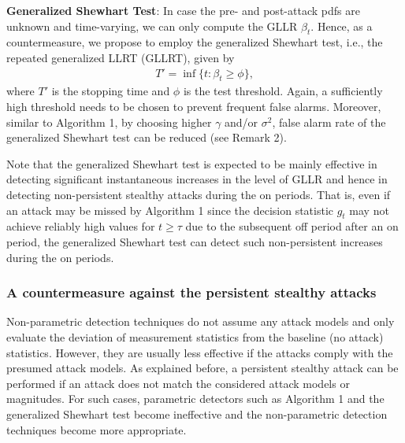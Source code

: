 \documentclass[onecolumn]{IEEEtran}
\def\inf{\mathop{\mathrm{inf}}}
\begin{document}
\vspace{0.2cm}

\textbf{Generalized Shewhart Test}: In case the pre- and post-attack pdfs are unknown and time-varying, we can only compute the GLLR $\beta_t$. Hence, as a countermeasure, we propose to employ the generalized Shewhart test, i.e., the repeated generalized LLRT (GLLRT), given by
\begin{gather}\label{GLLRT}
T' = \inf\{t: \beta_t \geq \phi\},
\end{gather}
where $T'$ is the stopping time and $\phi$ is the test threshold. Again, a sufficiently high threshold needs to be chosen to prevent frequent false alarms. Moreover, similar to Algorithm 1, by choosing higher $\gamma$ and/or $\sigma^2$, false alarm rate of the generalized Shewhart test can be reduced (see Remark 2).

Note that the generalized Shewhart test is expected to be mainly effective in detecting significant instantaneous increases in the level of GLLR and hence in detecting non-persistent stealthy attacks during the on periods. That is, even if an attack may be missed by Algorithm 1 since the decision statistic $g_t$ may not achieve reliably high values for $t \geq \tau$ due to the subsequent off period after an on period, the generalized Shewhart test can detect such non-persistent increases during the on periods.

\subsubsection{A countermeasure against the persistent stealthy attacks} \label{subsec:counter}

Non-parametric detection techniques do not assume any attack models and only evaluate the deviation of measurement statistics from the baseline (no attack) statistics. However, they are usually less effective if the attacks comply with the presumed attack models. As explained before, a persistent stealthy attack can be performed if an attack does not match the considered attack models or magnitudes. For such cases, parametric detectors such as Algorithm 1 and the generalized Shewhart test become ineffective and the non-parametric detection techniques become more appropriate.
\end{document}
